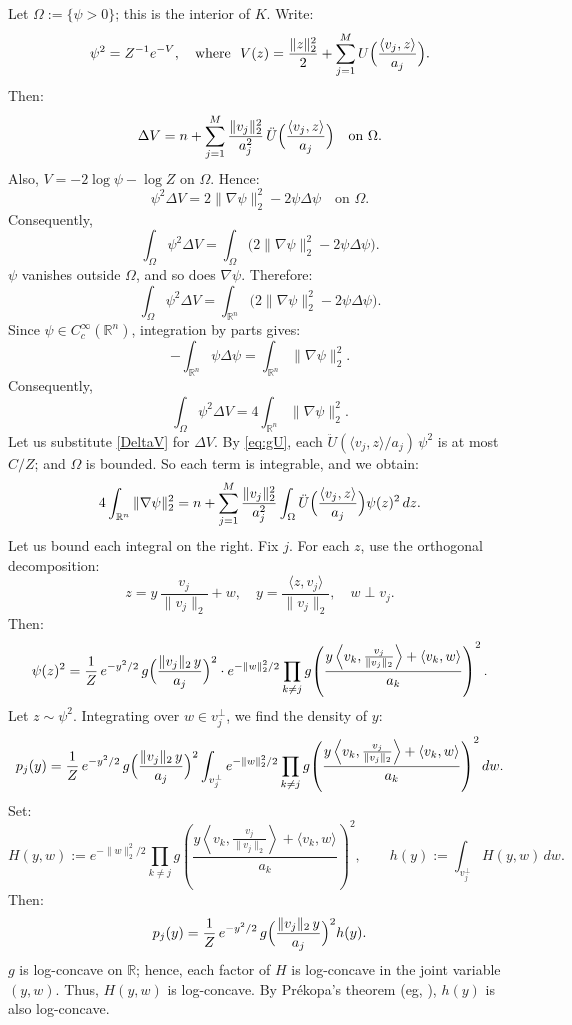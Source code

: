 \documentclass[12pt,reqno]{amsart}
\makeatletter
\theoremstyle{remark}
\renewenvironment{proof}[1][\proofname]{%
  \par\vspace{\topsep}%
  \normalfont\topsep6\p@\@plus6\p@\relax
  \trivlist
  \item[\hskip\labelsep\itshape #1\@addpunct{.}]\ignorespaces
}{%
  \endtrivlist
}
\numberwithin{equation}{section}
\def \R {\mathbb{R}}
\makeatother
\begin{document}
\begin{proof}
Let \(\Omega:=\{\psi>0\}\); this is the interior of \(K\). Write:
\[
\psi^2=Z^{-1}e^{-V},\quad
\text{where }\ V(z)=\frac{\|z\|_2^2}{2}+\sum_{j=1}^M U\Bigl(\frac{\langle v_j,z\rangle}{a_j}\Bigr).
\]
Then:
\begin{equation}\label{DeltaV}
\Delta V=n+\sum_{j=1}^M\frac{\|v_j\|_2^2}{a_j^2}\,\ddot U\Bigl(\frac{\langle v_j,z\rangle}{a_j}\Bigr)\quad\text{on }\Omega.
\end{equation}
Also, \(V=-2\log\psi-\log Z\) on \(\Omega\). Hence:
\[
\psi^2\Delta V=2\|\nabla\psi\|_2^2-2\psi\Delta\psi\quad\text{on }\Omega.
\]
Consequently,
\[
\int_\Omega\psi^2\Delta V=
\int_\Omega\bigl(2\|\nabla\psi\|_2^2-2\psi\Delta\psi\bigr).
\]
\(\psi\) vanishes outside \(\Omega\), and so does 
\(\nabla\psi\). Therefore:
\[
\int_\Omega\psi^2\Delta V=
\int_{\R^n}\bigl(2\|\nabla\psi\|_2^2-2\psi\Delta\psi\bigr).
\]
Since \(\psi\in C_c^\infty(\R^n)\), integration by parts gives:
\[
-\int_{\R^n}\psi\Delta\psi=\int_{\R^n}\|\nabla\psi\|_2^2.
\]
Consequently,
\[
\int_\Omega\psi^2\Delta V=4\int_{\R^n}\|\nabla\psi\|_2^2.
\]
Let us substitute \eqref{DeltaV} for \(\Delta V\). 
By \eqref{eq:gU}, each \(\ddot U(\langle v_j,z\rangle/a_j)\,\psi^2\) is at most \(C/Z\); and \(\Omega\) is bounded. So each term is integrable, and we obtain:
\begin{equation}\label{eq:energy-sum}
4\int_{\R^n}\|\nabla\psi\|_2^2
=n+\sum_{j=1}^M\frac{\|v_j\|_2^2}{a_j^2}
\int_\Omega\ddot U\Bigl(\frac{\langle v_j,z\rangle}{a_j}\Bigr)\psi(z)^2\,dz.
\end{equation}
Let us bound each integral on the right. Fix \(j\). For each \(z\), use the orthogonal decomposition:
\[
z=y\,\frac{v_j}{\|v_j\|_2}+w,\quad
y=\frac{\langle z,v_j\rangle}{\|v_j\|_2},\quad w\perp v_j.
\]
Then:
\[
\psi(z)^2=
\frac1Z\,e^{-y^2/2}\,
g\Bigl(\frac{\|v_j\|_2\,y}{a_j}\Bigr)^2
\cdot
e^{-\|w\|_2^2/2}
\prod_{k\ne j}
g\!\left(
\frac{y\left\langle v_k,\frac{v_j}{\|v_j\|_2}\right\rangle+\langle v_k,w\rangle}{a_k}
\right)^2.
\]
Let \(z\sim\psi^2\). Integrating over \(w\in v_j^\perp\), we find the density of \(y\):
\[
p_j(y)
=
\frac1Z\,e^{-y^2/2}\,
g\Bigl(\frac{\|v_j\|_2\,y}{a_j}\Bigr)^2
\int_{v_j^\perp}
e^{-\|w\|_2^2/2}
\prod_{k\ne j}
g\!\left(
\frac{y\left\langle v_k,\frac{v_j}{\|v_j\|_2}\right\rangle+\langle v_k,w\rangle}{a_k}
\right)^2
dw.
\]
Set:
\[
H(y,w):=e^{-\|w\|_2^2/2}
\prod_{k\ne j}
g\!\left(
\frac{y\left\langle v_k,\frac{v_j}{\|v_j\|_2}\right\rangle+\langle v_k,w\rangle}{a_k}
\right)^2,
\qquad
h(y):=\int_{v_j^\perp}H(y,w)\,dw.
\]
Then:
\[
p_j(y)=\frac1Z\,e^{-y^2/2}\,g\Bigl(\frac{\|v_j\|_2\,y}{a_j}\Bigr)^2h(y).
\]
\(g\) is log-concave on \(\R\); hence, each factor of \(H\) is log-concave in the joint variable \((y,w)\).
Thus, \(H(y,w)\) is log-concave. By Pr\'ekopa's theorem (eg, \cite{SaumWell}), \(h(y)\) is also log-concave. 
\smallskip%
 

\end{proof}
\end{document}
